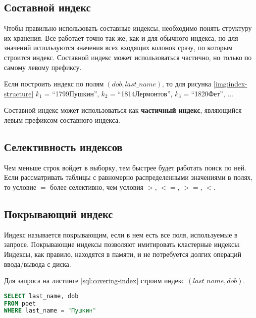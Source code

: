 \subsection{Составной индекс}

Чтобы правильно использовать составные индексы, необходимо понять структуру их хранения. Все работает точно так же, как и для обычного индекса, но для значений используются значения всех входящих колонок сразу, по которым строится индекс. Составной индекс может использоваться частично, но только по самому левому префиксу.

Если построить индекс по полям $(dob, last\_name)$, то для рисунка \ref{img:index-structure}
$k_1$ = “1799Пушкин”, $k_2$ = “1814Лермонтов”, $k_3$ = “1820Фет”, $\ldots$

Составной индекс может использоваться как \textbf{частичный индекс}, являющийся левым префиксом составного индекса. 

\subsection{Селективность индексов}

Чем меньше строк войдет в выборку, тем быстрее будет работать поиск по ней. Если рассматривать таблицы с равномерно распределенными значениями в полях, то условие $=$ более селективно, чем условия $>$, $<=$, $>=$, $<$.

\subsection{Покрывающий индекс}
\label{section:covering-index}

Индекс называется покрывающим, если в нем есть все поля, используемые в запросе. Покрывающие индексы позволяют имитировать кластерные индексы. Индексы, как правило, находятся в памяти, и не потребуется долгих операций ввода/вывода с диска. 

Для запроса на листинге \ref{sql:covering-index} строим индекс $(last\_name, dob)$.
\begin{lstlisting}[language=sql, label=sql:covering-index, caption={запрос для covering-index}]
SELECT last_name, dob
FROM poet
WHERE last_name = "Пушкин"
\end{lstlisting}
